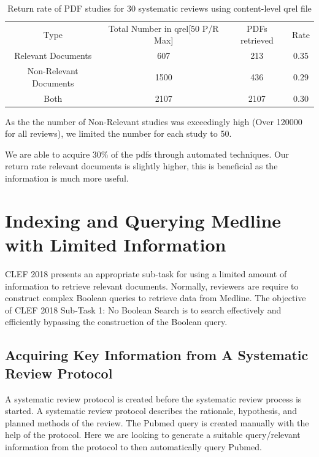 \begin{table}[H]

\centering
\begin{tabular}{|c|c|c|c|} 
\hline
 Type & Total Number in qrel[50 P/R Max] & PDFs retrieved & Rate  \\ 
 Relevant Documents & 607 &		213 & 0.35 \\ 
 Non-Relevant Documents & 1500 &		436 & 0.29 \\ 
 Both & 2107  &		2107 & 0.30 \\ 

 \hline
\end{tabular}

\caption{Return rate of PDF studies for 30 systematic reviews using content-level qrel file}

\end{table}

As the the number of Non-Relevant studies was exceedingly high (Over 120000 for all reviews), we limited the number for each study to 50. 

We are able to acquire  30\% of the pdfs through automated techniques. Our return rate relevant documents is slightly higher, this is beneficial as the information is much more useful.

\section{Indexing and Querying Medline with Limited Information}

CLEF 2018 \cite{CLEFLINK} presents an appropriate sub-task for using a limited amount of information to retrieve relevant documents. Normally, reviewers are require to construct complex Boolean queries to retrieve data from Medline. The objective of CLEF 2018 Sub-Task 1: No Boolean Search \cite{CLEFLINK} is to search effectively and efficiently bypassing the construction of the Boolean query.


\subsection{Acquiring Key Information from A Systematic Review Protocol}

A systematic review protocol is created before the systematic review process is started. A systematic review protocol describes the rationale, hypothesis, and planned methods of the review. The Pubmed query is created manually with the help of the protocol. Here we are looking to generate a suitable query/relevant information from the protocol to then automatically query Pubmed.

